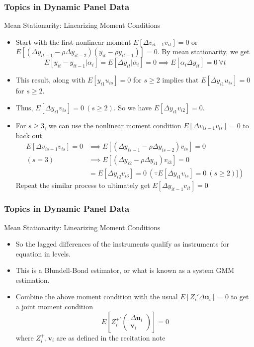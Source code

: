 \documentclass{beamer}
\begin{document}
\begin{frame}
\frametitle{Topics in Dynamic Panel Data}
Mean Stationarity: Linearizing Moment Conditions
\begin{itemize}
\item Start with the first nonlinear moment $E[\Delta v_{it-1}v_{it}]=0$ or $E[(\Delta y_{it-1}-\rho\Delta y_{it-2})(y_{it}-\rho y_{it-1})]=0$. By mean stationarity, we get
\[
E[y_{it}-y_{it-1}|\alpha_i]=E[\Delta y_{it}|\alpha_i]=0 \implies E[\alpha_i \Delta y_{it}]=0 \ \forall t
\]
\item This result, along with $E[y_{i1}u_{is}]=0$ for $s\geq 2$ implies that $E[\Delta y_{i1}u_{is}]=0$ for $s\geq 2$.
\item  Thus, $E[\Delta y_{i1}v_{is}]=0 \ (s\geq 2)$. So we have $E[\Delta y_{i1}v_{i2}]=0$. 
\item For $s\geq 3$, we can use the nonlinear moment condition $E[\Delta v_{is-1}v_{is}]=0$ to back out
\footnotesize{\begin{align*}
E[\Delta v_{is-1}v_{is}]=0&\implies E[(\Delta y_{is-1}-\rho \Delta y_{is-2})v_{is}]=0\\
(s=3)&\implies E[(\Delta y_{i2}-\rho\Delta y_{i1})v_{i3}]=0\\
&=E[\Delta y_{i2}v_{i3}]=0 \ (\because E[\Delta y_{i1}v_{is}]=0 \ (s\geq 2)])
\end{align*}}\normalsize
Repeat the similar process to ultimately get $E[\Delta y_{it-1}v_{it}]=0$
\end{itemize}
\end{frame}

\begin{frame}
\frametitle{Topics in Dynamic Panel Data}
Mean Stationarity: Linearizing Moment Conditions
\begin{itemize}
\item So the lagged differences of the instruments qualify as instruments for equation in levels. 
\item This is a Blundell-Bond estimator, or what is known as a system GMM estimation. 
\item Combine the above moment condition with the usual $E[Z_i'\Delta \mathbf{u}_i]=0$ to get a joint moment condition
\[
E\left[Z_i^{+'}\begin{pmatrix}\Delta \mathbf{u}_i \\ \mathbf{v}_i\end{pmatrix}\right]=0
\]
where $Z_i^+, \mathbf{v}_i$ are as defined in the recitation note
\end{itemize}
\end{frame}
\end{document}
